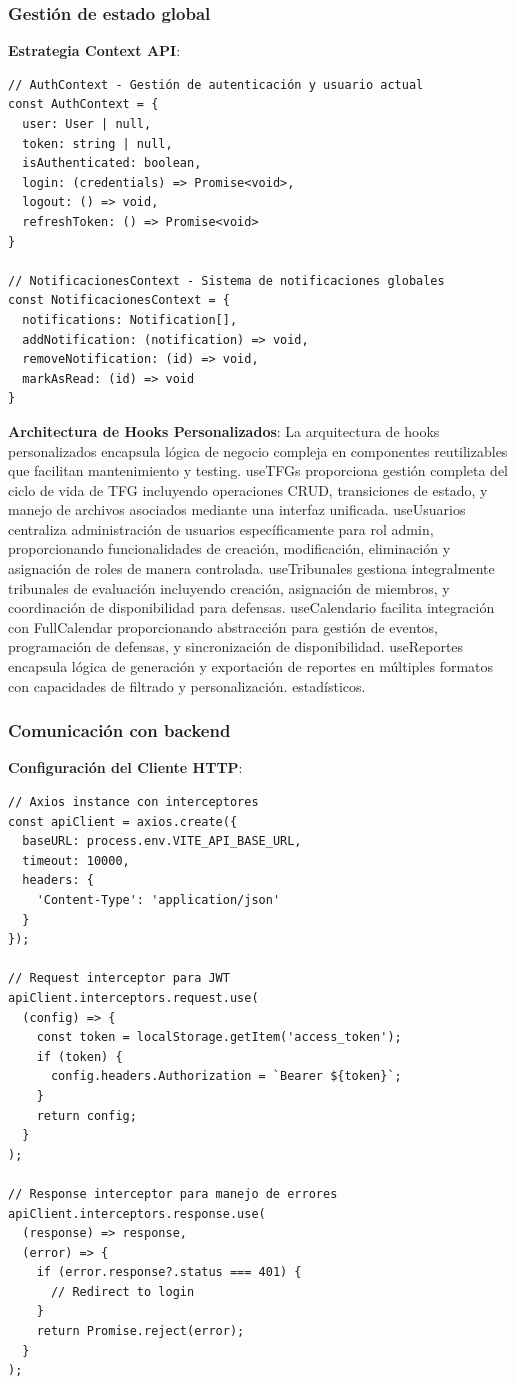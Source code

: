 \documentclass[12pt,a4paper,oneside]{report}
\begin{document}
\subsubsection{Gestión de estado
global}\label{gestiuxf3n-de-estado-global}

\textbf{Estrategia Context API}:

\begin{lstlisting}
// AuthContext - Gestión de autenticación y usuario actual
const AuthContext = {
  user: User | null,
  token: string | null,
  isAuthenticated: boolean,
  login: (credentials) => Promise<void>,
  logout: () => void,
  refreshToken: () => Promise<void>
}

// NotificacionesContext - Sistema de notificaciones globales
const NotificacionesContext = {
  notifications: Notification[],
  addNotification: (notification) => void,
  removeNotification: (id) => void,
  markAsRead: (id) => void
}
\end{lstlisting}

\textbf{Architectura de Hooks Personalizados}: La arquitectura de hooks personalizados encapsula lógica de negocio compleja en componentes reutilizables que facilitan mantenimiento y testing. useTFGs proporciona gestión completa del ciclo de vida de TFG incluyendo operaciones CRUD, transiciones de estado, y manejo de archivos asociados mediante una interfaz unificada. useUsuarios centraliza administración de usuarios específicamente para rol admin, proporcionando funcionalidades de creación, modificación, eliminación y asignación de roles de manera controlada. useTribunales gestiona integralmente tribunales de evaluación incluyendo creación, asignación de miembros, y coordinación de disponibilidad para defensas. useCalendario facilita integración con FullCalendar proporcionando abstracción para gestión de eventos, programación de defensas, y sincronización de disponibilidad. useReportes encapsula lógica de generación y exportación de reportes en múltiples formatos con capacidades de filtrado y personalización.
estadísticos.

\subsubsection{Comunicación con
backend}\label{comunicaciuxf3n-con-backend}

\textbf{Configuración del Cliente HTTP}:

\begin{lstlisting}
// Axios instance con interceptores
const apiClient = axios.create({
  baseURL: process.env.VITE_API_BASE_URL,
  timeout: 10000,
  headers: {
    'Content-Type': 'application/json'
  }
});

// Request interceptor para JWT
apiClient.interceptors.request.use(
  (config) => {
    const token = localStorage.getItem('access_token');
    if (token) {
      config.headers.Authorization = `Bearer ${token}`;
    }
    return config;
  }
);

// Response interceptor para manejo de errores
apiClient.interceptors.response.use(
  (response) => response,
  (error) => {
    if (error.response?.status === 401) {
      // Redirect to login
    }
    return Promise.reject(error);
  }
);
\end{lstlisting}
\end{document}
